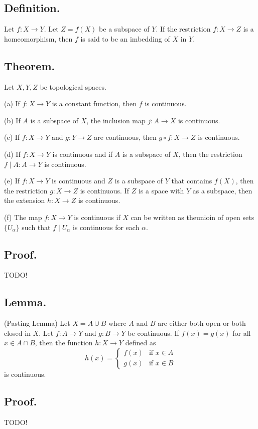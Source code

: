 \documentclass[titlepage]{article}
\begin{document}
\subsection{Definition.} Let $f: X \to Y$. Let $Z = f(X)$ be a subspace of $Y$. If the restriction $f: X \to Z$ is a homeomorphism, then $f$ is said to be an imbedding of $X$ in $Y$.

\subsection{Theorem.} Let $X, Y, Z$ be topological spaces.

(a) If $f: X \to Y$ is a constant function, then $f$ is continuous.

(b) If $A$ is a subspace of $X$, the inclusion map $j: A \to X$ is continuous.

(c) If $f: X \to Y$ and $g: Y \to Z$ are continuous, then $g \circ f: X \to Z$ is continuous.

(d) If $f: X \to Y$ is continuous and if $A$ is a subspace of $X$, then the restriction $f \mid A: A \to Y$ is continuous.

(e) If $f: X \to Y$ is continuous and $Z$ is a subspace of $Y$ that contains $f(X)$, then the restriction $g: X \to Z$ is continuous. If $Z$ is a space with $Y$ as a subspace, then the extension $h: X \to Z$ is continuous.

(f) The map $f: X \to Y$ is continuous if $X$ can be written as theunioin of open sets $\{U_{\alpha}\}$ such that $f \mid U_{\alpha}$ is continuous for each $\alpha$.

\subsection{Proof.} TODO!

\subsection{Lemma.} (Pasting Lemma) Let $X = A \cup B$ where $A$ and $B$ are either both open or both closed in $X$. Let $f: A \to Y$ and $g: B \to Y$ be continuous. If $f(x) = g(x)$ for all $x \in A \cap B$, then the function $h:X \to Y$ defined as 
$$h(x) = \begin{cases} f(x) & \text{if } x \in A \\ g(x) & \text{if } x \in B \end{cases}$$
is continuous.

\subsection{Proof.} TODO!
\end{document}
